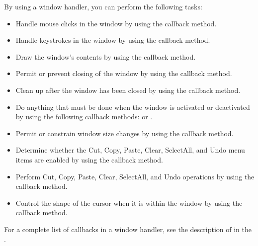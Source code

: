 \documentclass[letterpaper,12pt,english,openany,oneside]{sphinxmanual}
\begin{document}
By using a window handler, you can perform the following tasks:
\begin{itemize}
\item {} 
Handle mouse clicks in the window by using the  callback method.

\item {} 
Handle keystrokes in the window by using the  callback method.

\item {} 
Draw the window’s contents by using the  callback method.

\item {} 
Permit or prevent closing of the window by using the  callback method.

\item {} 
Clean up after the window has been closed by using the  callback method.

\item {} 
Do anything that must be done when the window is activated or deactivated by using the following callback methods:  or .

\item {} 
Permit or constrain window size changes by using the  callback method.

\item {} 
Determine whether the Cut, Copy, Paste, Clear, SelectAll, and Undo menu items are enabled by using the  callback method.

\item {} 
Perform Cut, Copy, Paste, Clear, SelectAll, and Undo operations by using the  callback method.

\item {} 
Control the shape of the cursor when it is within the window by using the  callback method.

\end{itemize}

For a complete list of callbacks in a window handler, see the description of  in the .
\end{document}

